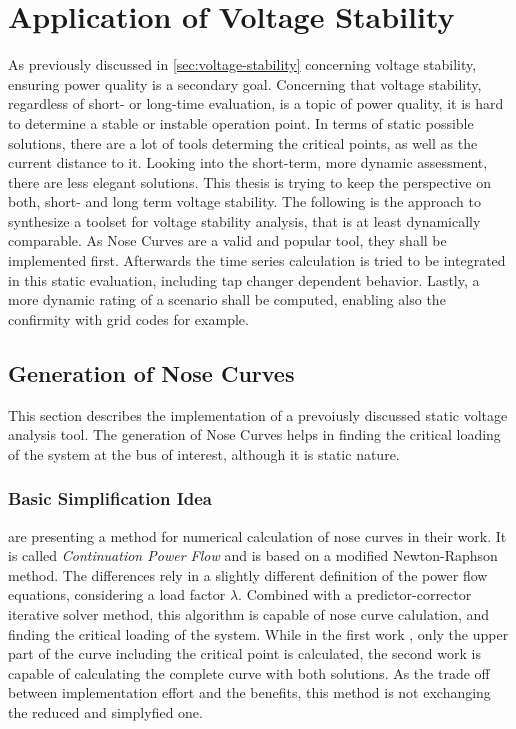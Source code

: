 \section{Application of Voltage Stability}
\label{sec:application-voltage-stability}

As previously discussed in \autoref{sec:voltage-stability} concerning voltage stability, ensuring power quality is a secondary goal.
Concerning that voltage stability, regardless of short- or long-time evaluation, is a topic of power quality, it is hard to determine a stable or instable operation point.
In terms of static possible solutions, there are a lot of tools determing the critical points, as well as the current distance to it.
Looking into the short-term, more dynamic assessment, there are less elegant solutions. 
This thesis is trying to keep the perspective on both, short- and long term voltage stability.
The following is the approach to synthesize a toolset for voltage stability analysis, that is at least dynamically comparable.
As Nose Curves are a valid and popular tool, they shall be implemented first. 
Afterwards the time series calculation is tried to be integrated in this static evaluation, including tap changer dependent behavior.
Lastly, a more dynamic rating of a scenario shall be computed, enabling also the confirmity with grid codes for example.

\subsection{Generation of Nose Curves}
\label{sec:nose-curves}

This section describes the implementation of a prevoiusly discussed static voltage analysis tool.
The generation of Nose Curves helps in finding the critical loading of the system at the bus of interest, although it is static nature. 

\subsubsection{Basic Simplification Idea}

\textcite{ajjarapu_1992, ajjarapu_2007} are presenting a method for numerical calculation of nose curves in their work. 
It is called {\itshape Continuation Power Flow} and is based on a modified Newton-Raphson method.
The differences rely in a slightly different definition of the power flow equations, considering a load factor $\lambda$.
Combined with a predictor-corrector iterative solver method, this algorithm is capable of nose curve calulation, and finding the critical loading of the system.
While in the first work \autocite{ajjarapu_1992}, only the upper part of the curve including the critical point is calculated, the second work \autocite{ajjarapu_2007} is capable of calculating the complete curve with both solutions. 
As the trade off between implementation effort and the benefits, this method is not exchanging the reduced and simplyfied one.

